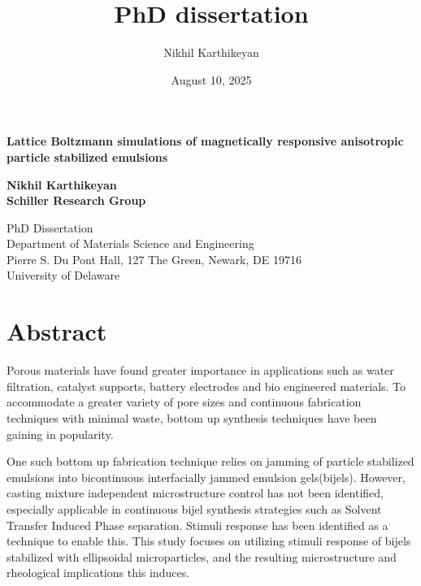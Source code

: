 \documentclass[12pt]{book}
\title{PhD dissertation}
\author{Nikhil Karthikeyan}
\date{August 10, 2025}
\begin{document}
\begin{titlepage}
\begin{center}

\vspace*{3cm}

\Large
\textbf{Lattice Boltzmann simulations of magnetically responsive anisotropic particle stabilized emulsions}



\vspace{0.5cm}
\textbf{Nikhil Karthikeyan} \\
\textbf{Schiller Research Group}

\vspace{3cm}

PhD Dissertation \\
Department of Materials Science and Engineering \\
Pierre S. Du Pont Hall, 127 The Green, Newark, DE 19716 \\
University of Delaware

\end{center}
\end{titlepage}

\newpage

\section*{Abstract}
Porous materials have found greater importance in applications such as water filtration, catalyst supports, battery electrodes and bio engineered materials. To accommodate a greater variety of pore sizes and continuous fabrication techniques with minimal waste, bottom up synthesis techniques have been gaining in popularity. 

One such bottom up fabrication technique relies on jamming of particle stabilized emulsions into bicontinuous interfacially jammed emulsion gels(bijels). However, casting mixture independent microstructure control has not been identified, especially applicable in continuous bijel synthesis strategies such as Solvent Transfer Induced Phase separation. Stimuli response has been identified as a technique to enable this. This study focuses on utilizing stimuli response of bijels stabilized with ellipsoidal microparticles, and the resulting microstructure and rheological implications this induces. 
\end{document}
